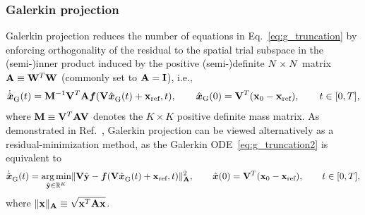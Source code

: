\documentclass[3p,computermodern,10pt]{elsarticle}
\begin{document}
\subsubsection{Galerkin projection}
Galerkin projection reduces the number of equations in
Eq.~\eqref{eq:g_truncation} by enforcing orthogonality of the 
residual to the spatial trial subspace in the (semi-)inner product induced by the 
positive (semi-)definite $\fomdim\times\fomdim$ matrix $\stweightingMatArg{}\equiv \stweightingMatOneArg{ }^T
\stweightingMatOneArg{ }$ (commonly set to
$\stweightingMatArg{}=\mathbf{I}$), i.e.,
\begin{equation}\label{eq:g_truncation2}
\genstateGalerkinDotArg{}{t} = \massArgnt{n}^{-1} \basisspace^T \stweightingMatArg{n} \velocity(\basisspace
\genstateGalerkinArg{}{t} + \stateIntercept,t), \qquad \genstateGalerkin(0) = \genstateIC, \qquad t \in [0,T],
\end{equation}
where $\massArgnt{ } \equiv \basisspace^T \stweightingMatArg{ } \basisspace$
denotes the $K\times K$ positive definite mass matrix.
As demonstrated in Ref.~\cite{carlberg_lspg_v_galerkin}, Galerkin projection
can be viewed alternatively as a residual-minimization
method, as the Galerkin ODE~\eqref{eq:g_truncation2} is equivalent
to
\begin{equation}\label{eq:GalOptimal}
\genstateGalerkinDotArg{}{t} = \underset{ \genstateyDiscrete \in \RR{\romdim}
	}{\text{arg\,min}} \| \basisspace \hat{\stateyDiscrete} -
	\velocity(\basisspace \genstateGalerkinArg{}{t} + \stateIntercept,t)
	\|_{\stweightingMatArg{n}}^2, \qquad \genstate(0) = \genstateIC,
	\qquad t \in [0,T],
\end{equation}
where $\|\mathbf{x}\|_{\stweightingMatArg{n}}\equiv
\sqrt{\mathbf{x}^T\stweightingMatArg{n}\mathbf{x}}$.
\end{document}
